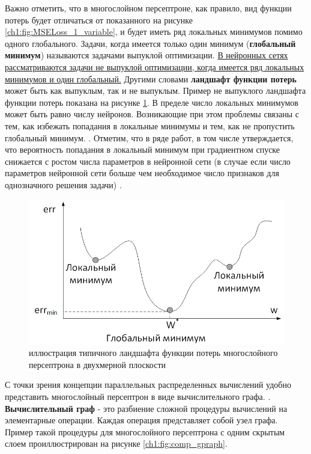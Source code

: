 \documentclass[12pt]{article}
\begin{document}
\begin{sloppypar}
Важно отметить, что в многослойном персептроне, как правило, вид функции потерь будет отличаться от показанного на рисунке 
\ref{ch1:fig:MSELoss_1_variable}, 
и будет иметь ряд локальных минимумов помимо одного глобального. Задачи, когда имеется только один минимум (\textbf{глобальный минимум}) 
называются задачами выпуклой оптимизации.
\uline{ В нейронных сетях рассматриваются задачи не выпуклой оптимизации, когда имеется ряд локальных минимумов и один глобальный.} Другими словами 
\textbf{ландшафт функции потерь} может быть как выпуклым, так и не выпуклым. Пример не выпуклого ландшафта  функции потерь показана на рисунке 
\ref{ch1:fig:Non_Convex_1var}. 
В пределе число локальных минимумов может быть равно числу нейронов. Возникающие при этом проблемы связаны с тем, как избежать попадания в локальные минимумы и тем, как не пропустить глобальный минимум.   
\cite{Nikolenko2017DL}.  Отметим, что в ряде работ, в том числе \cite{lecun1998gradient} утверждается, что вероятность попадания в локальный минимум при градиентном спуске снижается с ростом числа параметров в нейронной сети (в случае если число параметров нейронной сети больше чем необходимое число признаков для однозначного решения задачи) \cite{lecun1998gradient}. 

 \begin{figure}[h]
 	\begin{center}
 		\includegraphics[width=0.7\linewidth]{./figuresch1/Non_Convex_1var.png}
 		\caption{иллюстрация типичного ландшафта функции потерь многослойного персептрона в двухмерной плоскости}		
 		\label{ch1:fig:Non_Convex_1var}
 	\end{center}
 \end{figure}

С точки зрения концепции параллельных распределенных вычислений удобно представить многослойный персептрон в виде вычислительного графа. 
\cite{Nikolenko2017DL}.
\textbf{Вычислительный граф} - это разбиение сложной процедуры вычислений на элементарные операции. Каждая операция представляет собой узел графа. Пример такой процедуры для многослойного персептрона с одним скрытым слоем проиллюстрирован на рисунке \ref{ch1:fig:comp_gpraph}. 
 

\end{sloppypar}
\end{document}
